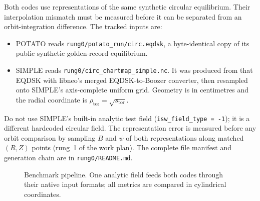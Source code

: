 \documentclass[11pt,a4paper]{article}
\newcommand{\code}[1]{\texttt{#1}}
\begin{document}
Both codes use representations of the same synthetic circular equilibrium.
Their interpolation mismatch must be measured before it can be separated from
an orbit-integration difference. The tracked inputs are:
\begin{itemize}
\item POTATO reads \code{rung0/potato\_run/circ.eqdsk}, a byte-identical copy
  of its public synthetic golden-record equilibrium.
\item SIMPLE reads \code{rung0/circ\_chartmap\_simple.nc}. It was produced
  from that EQDSK with libneo's merged EQDSK-to-Boozer converter, then
  resampled onto SIMPLE's axis-complete uniform grid. Geometry is in
  centimetres and the radial coordinate is
  $\rho_{\mathrm{tor}}=\sqrt{s_{\mathrm{tor}}}$.
\end{itemize}
Do not use SIMPLE's built-in analytic test field
(\code{isw\_field\_type = -1}); it is a different hardcoded circular field.
The representation error is measured before any orbit comparison by
sampling $B$ and $\psi$ of both representations along matched $(R,Z)$ points
(rung~1 of the work plan). The complete file manifest and generation chain are
in \code{rung0/README.md}.

\begin{figure}[htb]
\centering
{}
\caption{Benchmark pipeline. One analytic field feeds both codes through
their native input formats; all metrics are compared in cylindrical
coordinates.}
\label{fig:pipeline}
\end{figure}
\end{document}
